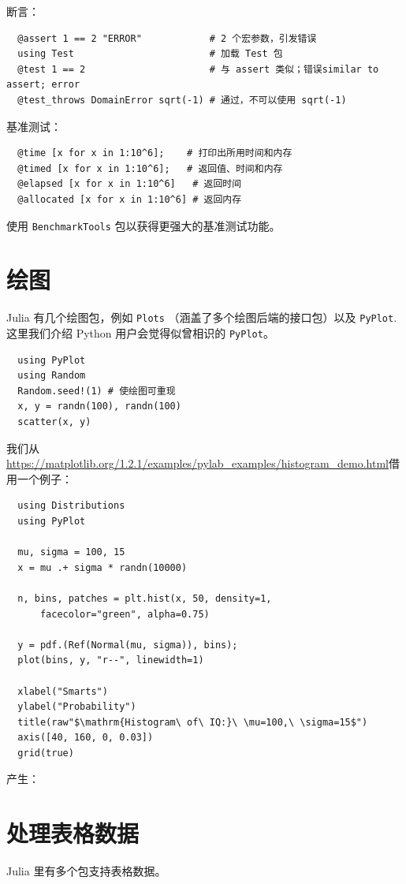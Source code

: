 \documentclass[10pt,a4paper]{article}
\begin{document}
断言：
\begin{lstlisting}
  @assert 1 == 2 "ERROR"            # 2 个宏参数，引发错误
  using Test                        # 加载 Test 包
  @test 1 == 2                      # 与 assert 类似；错误similar to assert; error
  @test_throws DomainError sqrt(-1) # 通过，不可以使用 sqrt(-1)
\end{lstlisting}

基准测试：
\begin{lstlisting}
  @time [x for x in 1:10^6];    # 打印出所用时间和内存
  @timed [x for x in 1:10^6];   # 返回值、时间和内存
  @elapsed [x for x in 1:10^6]   # 返回时间
  @allocated [x for x in 1:10^6] # 返回内存
\end{lstlisting}
使用 \lstinline|BenchmarkTools| 包以获得更强大的基准测试功能。

\section{绘图}
\label{sec:plot}
Julia 有几个绘图包，例如 \lstinline|Plots| （涵盖了多个绘图后端的接口包）以及 \lstinline|PyPlot|.
这里我们介绍 Python 用户会觉得似曾相识的 \lstinline|PyPlot|。
\begin{lstlisting}
  using PyPlot
  using Random
  Random.seed!(1) # 使绘图可重现
  x, y = randn(100), randn(100)
  scatter(x, y)
\end{lstlisting}

我们从\url{https://matplotlib.org/1.2.1/examples/pylab_examples/histogram_demo.html}借用一个例子：
\begin{lstlisting}
  using Distributions
  using PyPlot

  mu, sigma = 100, 15
  x = mu .+ sigma * randn(10000)

  n, bins, patches = plt.hist(x, 50, density=1,
      facecolor="green", alpha=0.75)

  y = pdf.(Ref(Normal(mu, sigma)), bins);
  plot(bins, y, "r--", linewidth=1)

  xlabel("Smarts")
  ylabel("Probability")
  title(raw"$\mathrm{Histogram\ of\ IQ:}\ \mu=100,\ \sigma=15$")
  axis([40, 160, 0, 0.03])
  grid(true)
\end{lstlisting}

产生：


\section{处理表格数据}

Julia 里有多个包支持表格数据。
\end{document}
